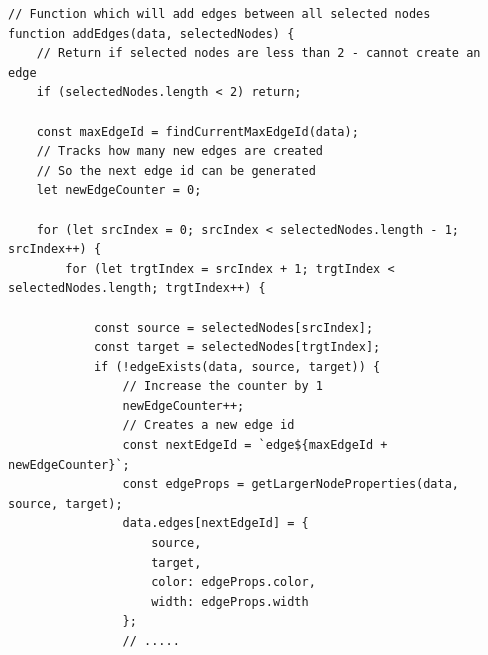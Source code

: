 \begin{lstlisting}[style=JavaScript, firstnumber = 92, caption={utils/graphManager.js, přidání hran a jejich automatická konfigurace},
label={edgeadd}]
// Function which will add edges between all selected nodes
function addEdges(data, selectedNodes) {
    // Return if selected nodes are less than 2 - cannot create an edge
    if (selectedNodes.length < 2) return;
    
    const maxEdgeId = findCurrentMaxEdgeId(data);
    // Tracks how many new edges are created
    // So the next edge id can be generated
    let newEdgeCounter = 0;
    
    for (let srcIndex = 0; srcIndex < selectedNodes.length - 1; srcIndex++) {
        for (let trgtIndex = srcIndex + 1; trgtIndex < selectedNodes.length; trgtIndex++) {

            const source = selectedNodes[srcIndex];
            const target = selectedNodes[trgtIndex];
            if (!edgeExists(data, source, target)) {
                // Increase the counter by 1
                newEdgeCounter++;
                // Creates a new edge id
                const nextEdgeId = `edge${maxEdgeId + newEdgeCounter}`;
                const edgeProps = getLargerNodeProperties(data, source, target);
                data.edges[nextEdgeId] = { 
                    source, 
                    target, 
                    color: edgeProps.color,
                    width: edgeProps.width
                };
                // .....
\end{lstlisting}

